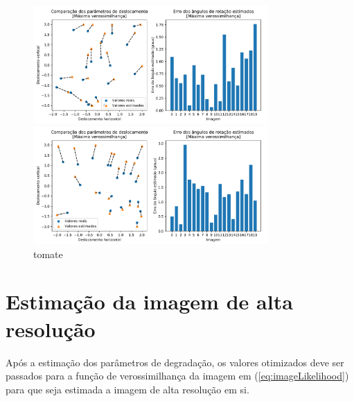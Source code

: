 \begin{figure}[H]
	\centering
	\caption{tomate}
	\begin{minipage}[b]{.99\linewidth}
		\centering
		\includegraphics[width=0.8\textwidth]{./figures/results_figures/comparisson_plot.pdf}
	\end{minipage}

	\begin{minipage}[b]{.99\linewidth}
		\centering
		\includegraphics[width=0.8\textwidth]{./figures/results_figures/comparisson_plot2.pdf}
		
	\end{minipage}
\end{figure}


\section{Estimação da imagem de alta resolução}
Após a estimação dos parâmetros de degradação, os valores otimizados deve ser passados para a função de verossimilhança da imagem em (\ref{eq:imageLikelihood}) para que seja estimada a imagem de alta resolução em si.

